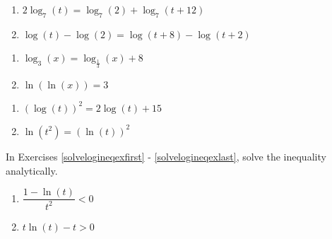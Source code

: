 \documentclass{ximera}
\begin{document}
\begin{enumerate}
\setcounter{enumi}{\value{HW}}

\item $2\log_{7}(t) = \log_{7}(2) + \log_{7}(t+12)$

\item $\log(t) - \log(2) = \log(t+8)  - \log(t+2)$

\setcounter{HW}{\value{enumi}}
\end{enumerate}

\begin{enumerate}
\setcounter{enumi}{\value{HW}}

\item $\log_{3}(x) = \log_{\frac{1}{3}}(x) + 8$

\item $\ln(\ln(x)) = 3$

\setcounter{HW}{\value{enumi}}
\end{enumerate}

\begin{enumerate}
\setcounter{enumi}{\value{HW}}

\item $\left(\log(t)\right)^2=2\log(t)+15$

\item $\ln(t^{2}) = (\ln(t))^{2}$ \label{solvelogeqexlast}

\setcounter{HW}{\value{enumi}}
\end{enumerate}


In Exercises \ref{solvelogineqexfirst} - \ref{solvelogineqexlast}, solve the inequality analytically.

\begin{enumerate}
\setcounter{enumi}{\value{HW}}

\item $\dfrac{1 - \ln(t)}{t^{2}} < 0$ \label{solvelogineqexfirst}
\item $t\ln(t) - t > 0$   


\setcounter{HW}{\value{enumi}}
\end{enumerate}
\end{document}
